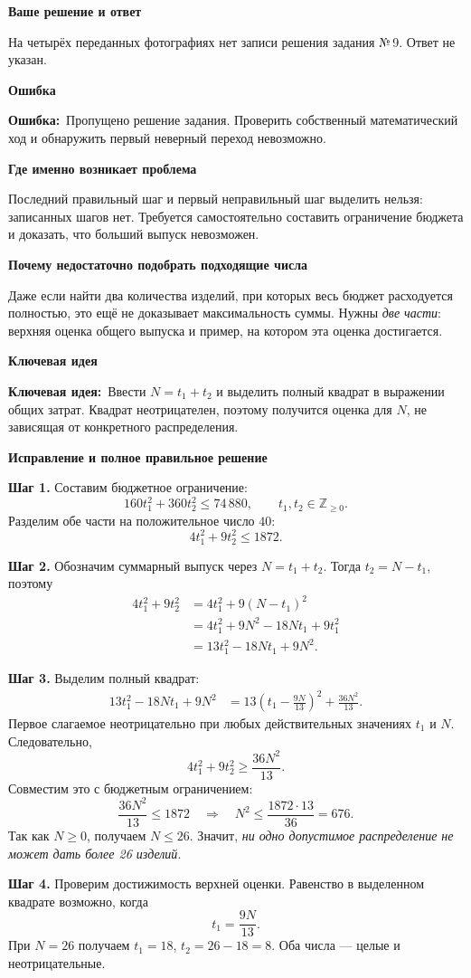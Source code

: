 \documentclass[a4paper,12pt]{article}
\newcommand{\markerror}{\textcolor{errorred}{\textbf{Ошибка:}}}
\newcommand{\keyidea}{\textcolor{deep}{\textbf{Ключевая идея:}}}
\newcommand{\sublabel}[1]{\par\vspace{0.35em}\noindent\textbf{#1}\par\vspace{0.05em}}
\begin{document}
\sublabel{Ваше решение и ответ}
На четырёх переданных фотографиях нет записи решения задания №\,9. Ответ не указан.

\sublabel{Ошибка}
\markerror\ Пропущено решение задания. Проверить собственный математический ход и обнаружить первый неверный переход невозможно.

\sublabel{Где именно возникает проблема}
Последний правильный шаг и первый неправильный шаг выделить нельзя: записанных шагов нет. Требуется самостоятельно составить ограничение бюджета и доказать, что больший выпуск невозможен.

\sublabel{Почему недостаточно подобрать подходящие числа}
Даже если найти два количества изделий, при которых весь бюджет расходуется полностью, это ещё не доказывает максимальность суммы. Нужны \emph{две части}: верхняя оценка общего выпуска и пример, на котором эта оценка достигается.

\sublabel{Ключевая идея}
\keyidea\ Ввести $N=t_1+t_2$ и выделить полный квадрат в выражении общих затрат. Квадрат неотрицателен, поэтому получится оценка для $N$, не зависящая от конкретного распределения.

\sublabel{Исправление и полное правильное решение}
\textbf{Шаг 1.} Составим бюджетное ограничение:
\[
160t_1^2+360t_2^2\le 74\,880,\qquad
 t_1,t_2\in\mathbb Z_{\ge0}.
\]
Разделим обе части на положительное число $40$:
\[
4t_1^2+9t_2^2\le1872.
\]

\textbf{Шаг 2.} Обозначим суммарный выпуск через $N=t_1+t_2$. Тогда $t_2=N-t_1$, поэтому
\begin{align*}
4t_1^2+9t_2^2
 &=4t_1^2+9(N-t_1)^2\\
 &=4t_1^2+9N^2-18Nt_1+9t_1^2\\
 &=13t_1^2-18Nt_1+9N^2.
\end{align*}

\textbf{Шаг 3.} Выделим полный квадрат:
\begin{align*}
13t_1^2-18Nt_1+9N^2
 &=13\left(t_1-\frac{9N}{13}\right)^2
   +\frac{36N^2}{13}.
\end{align*}
Первое слагаемое неотрицательно при любых действительных значениях $t_1$ и $N$. Следовательно,
\[
4t_1^2+9t_2^2\ge\frac{36N^2}{13}.
\]
Совместим это с бюджетным ограничением:
\[
\frac{36N^2}{13}\le 1872
\quad\Longrightarrow\quad
N^2\le\frac{1872\cdot13}{36}=676.
\]
Так как $N\ge0$, получаем $N\le 26$. Значит, \emph{ни одно допустимое распределение не может дать более 26 изделий}.

\textbf{Шаг 4.} Проверим достижимость верхней оценки. Равенство в выделенном квадрате возможно, когда
\[
t_1=\frac{9N}{13}.
\]
При $N=26$ получаем $t_1=18$, $t_2=26-18=8$. Оба числа --- целые и неотрицательные.
\end{document}
